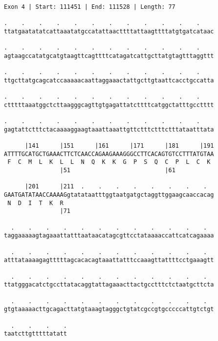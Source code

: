 \documentclass{article}
\begin{document}
\begin{Verbatim}
Exon 4 | Start: 111451 | End: 111528 | Length: 77
 
.    .    .    .    .    .    .    .    .    .    .    .    
ttatgaatatatcattaaatatgccatattaacttttattaagttttatgtgatcataac
  
.    .    .    .    .    .    .    .    .    .    .    .    
agtaagccatatgcatgtaagttcagttttcatagatcattgcttatgtagtttaggttt
  
.    .    .    .    .    .    .    .    .    .    .    .    
ttgcttatgcagcatccaaaaacaattaggaaactattgcttgtaattcacctgccatta
  
.    .    .    .    .    .    .    .    .    .    .    .    
ctttttaaatggctcttaagggcagttgtgagattatcttttcatggctatttgcctttt
  
.    .    .    .    .    .    .    .    .    .    .    .    
gagtattctttctacaaaaggaagtaaattaaattgttctttctttctttataatttata
  
      |141      |151      |161      |171      |181      |191
ATTTTGCATGCTGAAACTTCTCAACCAGAAGAAAGGGCCTTCACAGTGTCCTTTATGTAA
 F  C  M  L  K  L  L  N  Q  K  K  G  P  S  Q  C  P  L  C  K 
                |51                           |61           
  
      |201      |211  .    .    .    .    .    .    .    .  
GAATGATATAACCAAAAGgtatataatttggtaatgatgctaggttggaagcaaccacag
 N  D  I  T  K  R                                           
                |71                                         
  
  .    .    .    .    .    .    .    .    .    .    .    .  
taggaaaaagtagaaattatttaataacatagcgttcctataaaaccattcatcagaaaa
  
  .    .    .    .    .    .    .    .    .    .    .    .  
atttataaaagagtttttagcacacagtaaattatttccaaagttattttcctgaaagtt
  
  .    .    .    .    .    .    .    .    .    .    .    .  
ttatgggacatctgccttatacaggtattagaaacttactgcctttctctaatgcttcta
  
  .    .    .    .    .    .    .    .    .    .    .    .  
gtgtaaaaacttgcagacttatgtaaagtagggctgtatcgccgtgcccccattgtctgt
  
  .    .    .    .
taatcttgtttttatatt
\end{Verbatim}
\newpage
\end{document}
